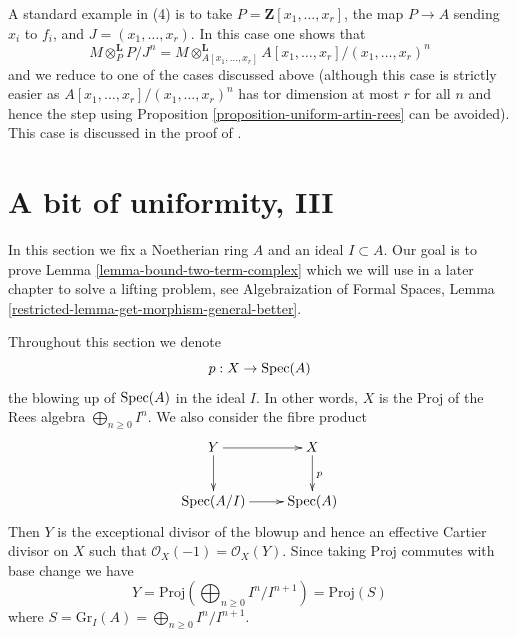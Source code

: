 \begin{remark}
\medskip\noindent
A standard example in (4) is to take $P = \mathbf{Z}[x_1, \ldots, x_r]$,
the map $P \to A$ sending $x_i$ to $f_i$, and $J = (x_1, \ldots, x_r)$.
In this case one shows that
$$
M \otimes_P^\mathbf{L} P/J^n =
M \otimes_{A[x_1, \ldots, x_r]}^\mathbf{L}
A[x_1, \ldots, x_r]/(x_1, \ldots, x_r)^n
$$
and we reduce to one of the cases discussed above (although this case
is strictly easier as $A[x_1, \ldots, x_r]/(x_1, \ldots, x_r)^n$ has
tor dimension at most $r$ for all $n$ and hence the step using
Proposition \ref{proposition-uniform-artin-rees} can be avoided).
This case is discussed in the proof of \cite[Proposition 3.5.1]{BS}.
\end{remark}








\section{A bit of uniformity, III}
\label{section-uniform}

\noindent
In this section we fix a Noetherian ring $A$ and an ideal $I \subset A$.
Our goal is to prove Lemma \ref{lemma-bound-two-term-complex} which we will
use in a later chapter to solve a lifting problem, see
Algebraization of Formal Spaces, Lemma
\ref{restricted-lemma-get-morphism-general-better}.

\medskip\noindent
Throughout this section we denote
$$
p : X \to \mathop{\mathrm{Spec}}(A)
$$
the blowing up of $\mathop{\mathrm{Spec}}(A)$ in the ideal $I$. In other words, $X$ is the
$\text{Proj}$ of the Rees algebra $\bigoplus_{n \geq 0} I^n$. We also consider
the fibre product
$$
\xymatrix{
Y \ar[r] \ar[d] & X \ar[d]^p \\
\Spec(A/I) \ar[r] & \Spec(A)
}
$$
Then $Y$ is the exceptional divisor of the blowup and hence
an effective Cartier divisor on $X$ such that
$\mathcal{O}_X(-1) = \mathcal{O}_X(Y)$. Since taking $\text{Proj}$
commutes with base change we have
$$
Y = \text{Proj}(\bigoplus\nolimits_{n \geq 0} I^n/I^{n + 1}) = \text{Proj}(S)
$$
where $S = \text{Gr}_I(A) = \bigoplus_{n \geq 0} I^n/I^{n + 1}$.

